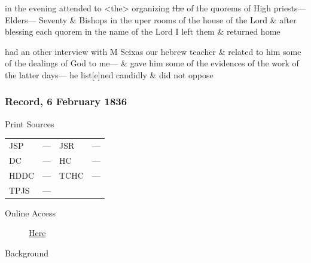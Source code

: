 					in the evening attended to <the> organizing \sout{the} of the quorems of High priests--- Elders--- Seventy \& Bishops in the uper rooms of the house of the Lord \& after blessing each quorem in the name of the Lord I left them \& returned home
					
					had an other interview with M Seixas our hebrew teacher \& related to him some of the dealings of God to me--- \& gave him some of the evidences of the work of the latter days--- he list[e]ned candidly \& did not oppose
					
		\subsubsection{Record, 6 February 1836}
			\label{EMS-1836-JS-6-FEB-1836}
			
			\begin{description}
					\item[Print Sources]
				\end{description}

					\begin{tabular}{p{0.5in}p{1in}p{0.5in}p{1in}}
					JSP	 	& ---		& JSR 		& --- \\
					DC	 	& ---		& HC 		& --- \\
					HDDC 	& ---		& TCHC 		& --- \\
					TPJS 	& ---		& 	 		&  \\
					\end{tabular}
				
				\begin{description}
					\item[Online Access] \href{https://www.josephsmithpapers.org/paper-summary/journal-1835-1836/152}{Here}
				\end{description}
				
				\begin{description}
					\item[Background]
				\end{description}
				
				
